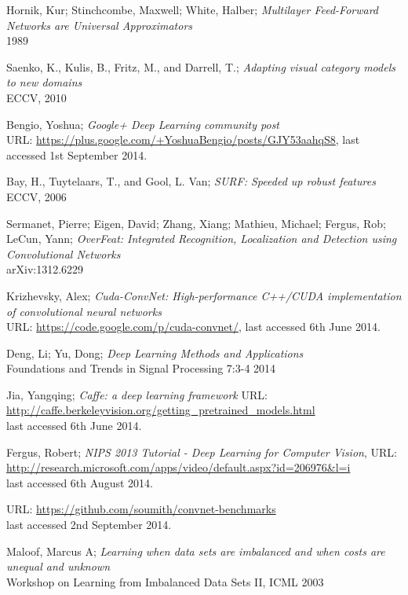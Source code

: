 \documentclass[a4paper,11pt]{article}
\begin{document}
\begin{thebibliography}{1}
 Hornik, Kur; Stinchcombe, Maxwell; White, Halber;
 \emph{Multilayer Feed-Forward Networks are Universal Approximators}\\
 1989

 Saenko, K., Kulis, B., Fritz, M., and Darrell, T.;
 \emph{Adapting visual category models to new domains}\\
 ECCV, 2010

 Bengio, Yoshua;
 \emph{Google+ Deep Learning community post}\\
 URL: \url{https://plus.google.com/+YoshuaBengio/posts/GJY53aahqS8}, last accessed 1st September 2014.
 
 Bay, H., Tuytelaars, T., and Gool, L. Van;
 \emph{SURF: Speeded up robust features}\\
 ECCV, 2006

 Sermanet, Pierre; Eigen, David; Zhang, Xiang; Mathieu, Michael; Fergus, Rob; LeCun, Yann;
 \emph{OverFeat: Integrated Recognition, Localization and Detection using Convolutional Networks}\\
 arXiv:1312.6229
   
 Krizhevsky, Alex; 
 \emph{Cuda-ConvNet: High-performance C++/CUDA implementation of convolutional neural networks}\\
 URL: \url{https://code.google.com/p/cuda-convnet/}, last accessed 6th June 2014.
 
 Deng, Li; Yu, Dong;
 \emph{Deep Learning Methods and Applications}\\
 Foundations and Trends in Signal Processing
 7:3-4 2014

 Jia, Yangqing;
 \emph{Caffe: a deep learning framework} 
 URL: \url{http://caffe.berkeleyvision.org/getting_pretrained_models.html}\\ last accessed 6th June 2014.

 Fergus, Robert;
 \emph{NIPS 2013 Tutorial - Deep Learning for Computer Vision},
 URL: \url{http://research.microsoft.com/apps/video/default.aspx?id=206976&l=i}\\ last accessed 6th August 2014.

 URL: \url{https://github.com/soumith/convnet-benchmarks}\\ last accessed 2nd September 2014.

 Maloof, Marcus A;
 \emph{Learning when data sets are imbalanced and when costs are unequal and unknown}\\
 Workshop on Learning from Imbalanced Data Sets II,
 ICML 2003
 

\end{thebibliography}
\end{document}
